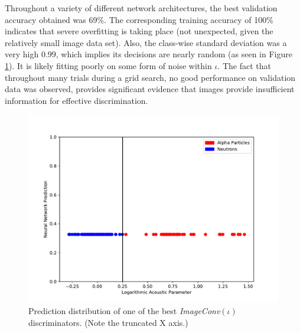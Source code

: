 \documentclass[10pt]{article}
\begin{document}
Throughout a variety of different network architectures, the best validation accuracy obtained was 69\%. The corresponding training accuracy of 100\% indicates that severe overfitting is taking place (not unexpected, given the relatively small image data set). Also, the class-wise standard deviation was a very high 0.99, which implies its decisions are nearly random (as seen in Figure \ref{image_hist}). It is likely fitting poorly on some form of noise within $\iota$. The fact that throughout many trials during a grid search, no good performance on validation data was observed, provides significant evidence that images provide insufficient information for effective discrimination.

\begin{figure}[h]
    \centering
    \includegraphics[width=\textwidth]{image_hist}
    \caption{\label{image_hist} Prediction distribution of one of the best {\it ImageConv}$(\iota)$ discriminators. (Note the truncated X axis.)}
\end{figure}
\end{document}
